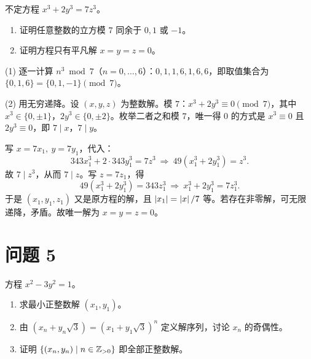 \documentclass{article}
\begin{document}
不定方程 $x^3+2y^3=7z^3$。

\begin{enumerate}[(1)]
  \item 证明任意整数的立方模 $7$ 同余于 $0,1$ 或 $-1$。
  \item 证明方程只有平凡解 $x=y=z=0$。
\end{enumerate}

\begin{solution}
  (1) 逐一计算 $n^3\bmod 7$（$n=0,\dots,6$）：$0,1,1,6,1,6,6$，即取值集合为 $\{0,1,6\}=\{0,1,-1\}\pmod 7$。

  (2) 用无穷递降。设 $(x,y,z)$ 为整数解。模 $7$：$x^3+2y^3\equiv 0\pmod 7$，其中 $x^3\in\{0,\pm1\}$，$2y^3\in\{0,\pm2\}$。枚举二者之和模 $7$，唯一得 $0$ 的方式是 $x^3\equiv 0$ 且 $2y^3\equiv 0$，即 $7\mid x$，$7\mid y$。

  写 $x=7x_1,\ y=7y_1$，代入：
  \[
    343x_1^3+2\cdot 343y_1^3=7z^3\ \Longrightarrow\ 49(x_1^3+2y_1^3)=z^3 .
  \]
  故 $7\mid z^3$，从而 $7\mid z$。写 $z=7z_1$，得
  \[
    49(x_1^3+2y_1^3)=343 z_1^3\ \Longrightarrow\ x_1^3+2y_1^3=7z_1^3 .
  \]
  于是 $(x_1,y_1,z_1)$ 又是原方程的解，且 $\left| x_1 \right|=\left| x \right|/7$ 等。若存在非零解，可无限递降，矛盾。故唯一解为 $x=y=z=0$。
\end{solution}

\section{问题 5}

方程 $x^2-3y^2=1$。

\begin{enumerate}[(1)]
  \item 求最小正整数解 $(x_1,y_1)$。
  \item 由 $(x_n+y_n\sqrt3)=(x_1+y_1\sqrt3)^n$ 定义解序列，讨论 $x_n$ 的奇偶性。
  \item 证明 $\{(x_n,y_n)\mid n\in\mathbb{Z}_{>0}\}$ 即全部正整数解。
\end{enumerate}
\end{document}
